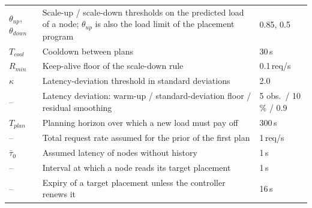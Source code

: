 \begin{table}[htbp]
\begin{tabularx}{\textwidth}{l X l}
        $\theta_{up}$, $\theta_{down}$ & Scale-up / scale-down thresholds on the predicted load of a node; $\theta_{up}$ is also the load limit of the placement program & 0.85, 0.5 \\
        $T_{cool}$ & Cooldown between plans & 30\,s \\
        $R_{min}$ & Keep-alive floor of the scale-down rule & 0.1\,req/s \\
        $\kappa$ & Latency-deviation threshold in standard deviations & 2.0 \\
        -- & Latency deviation: warm-up / standard-deviation floor / residual smoothing & 5 obs.\ / 10\,\% / 0.9 \\
        $T_{plan}$ & Planning horizon over which a new load must pay off & 300\,s \\
        -- & Total request rate assumed for the prior of the first plan & 1\,req/s \\
        $\bar{\tau}_0$ & Assumed latency of nodes without history & 1\,s \\
        -- & Interval at which a node reads its target placement & 1\,s \\
        -- & Expiry of a target placement unless the controller renews it & 16\,s \\
        \bottomrule
    \end{tabularx}
\end{table}

